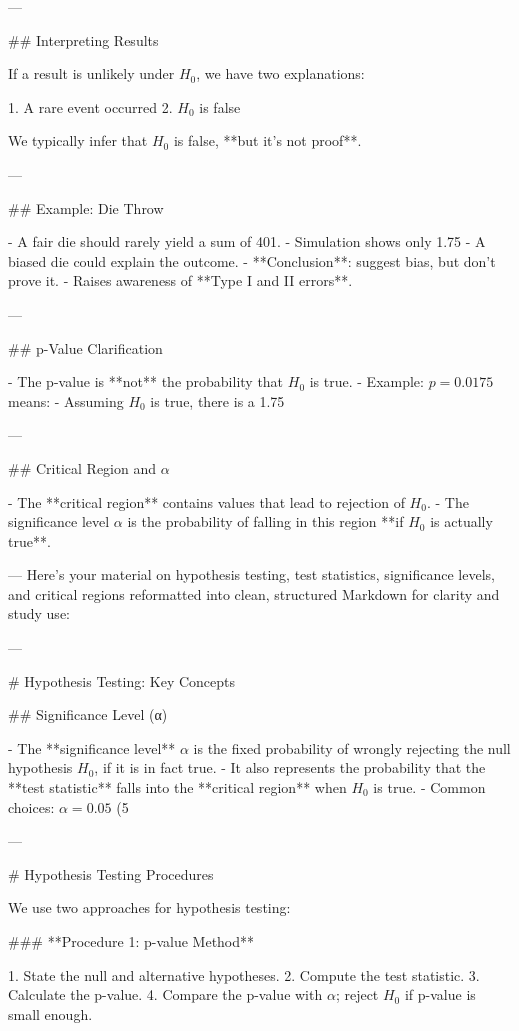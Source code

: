 ---

## Interpreting Results

If a result is unlikely under \( H_0 \), we have two explanations:

1. A rare event occurred
2. \( H_0 \) is false

We typically infer that \( H_0 \) is false, **but it’s not proof**.

---

## Example: Die Throw

- A fair die should rarely yield a sum of 401.
- Simulation shows only 1.75%
- A biased die could explain the outcome.
- **Conclusion**: suggest bias, but don't prove it.
- Raises awareness of **Type I and II errors**.

---

## p-Value Clarification

- The p-value is **not** the probability that \( H_0 \) is true.
- Example: \( p = 0.0175 \) means:
  - Assuming \( H_0 \) is true, there is a 1.75%

---

## Critical Region and \( \alpha \)

- The **critical region** contains values that lead to rejection of \( H_0 \).
- The significance level \( \alpha \) is the probability of falling in this region **if \( H_0 \) is actually true**.

---
Here’s your material on hypothesis testing, test statistics, significance levels, and critical regions reformatted into clean, structured Markdown for clarity and study use:

---

# Hypothesis Testing: Key Concepts

## Significance Level (α)

- The **significance level** \( \alpha \) is the fixed probability of wrongly rejecting the null hypothesis \( H_0 \), if it is in fact true.
- It also represents the probability that the **test statistic** falls into the **critical region** when \( H_0 \) is true.
- Common choices: \( \alpha = 0.05 \) (5%

---

# Hypothesis Testing Procedures

We use two approaches for hypothesis testing:

### **Procedure 1: p-value Method**

1. State the null and alternative hypotheses.
2. Compute the test statistic.
3. Calculate the p-value.
4. Compare the p-value with \( \alpha \); reject \( H_0 \) if p-value is small enough.


